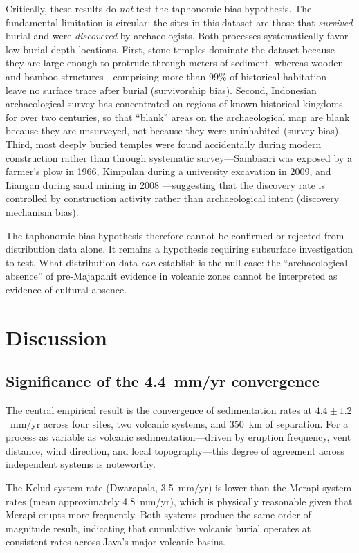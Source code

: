 \documentclass[12pt,a4paper]{article}
\begin{document}
Critically, these results do \textit{not} test the taphonomic bias hypothesis. The fundamental limitation is circular: the sites in this dataset are those that \textit{survived} burial and were \textit{discovered} by archaeologists. Both processes systematically favor low-burial-depth locations. First, stone temples dominate the dataset because they are large enough to protrude through meters of sediment, whereas wooden and bamboo structures---comprising more than 99\% of historical habitation---leave no surface trace after burial (survivorship bias). Second, Indonesian archaeological survey has concentrated on regions of known historical kingdoms for over two centuries, so that ``blank'' areas on the archaeological map are blank because they are unsurveyed, not because they were uninhabited (survey bias). Third, most deeply buried temples were found accidentally during modern construction rather than through systematic survey---Sambisari was exposed by a farmer's plow in 1966, Kimpulan during a university excavation in 2009, and Liangan during sand mining in 2008 \citep{putra2019,abbas2016}---suggesting that the discovery rate is controlled by construction activity rather than archaeological intent (discovery mechanism bias).

The taphonomic bias hypothesis therefore cannot be confirmed or rejected from distribution data alone. It remains a hypothesis requiring subsurface investigation to test. What distribution data \textit{can} establish is the null case: the ``archaeological absence'' of pre-Majapahit evidence in volcanic zones cannot be interpreted as evidence of cultural absence.


\section{Discussion}

\subsection{Significance of the 4.4~mm/yr convergence}

The central empirical result is the convergence of sedimentation rates at $4.4 \pm 1.2$~mm/yr across four sites, two volcanic systems, and 350~km of separation. For a process as variable as volcanic sedimentation---driven by eruption frequency, vent distance, wind direction, and local topography---this degree of agreement across independent systems is noteworthy.

The Kelud-system rate (Dwarapala, 3.5~mm/yr) is lower than the Merapi-system rates (mean approximately 4.8~mm/yr), which is physically reasonable given that Merapi erupts more frequently. Both systems produce the same order-of-magnitude result, indicating that cumulative volcanic burial operates at consistent rates across Java's major volcanic basins.
\end{document}
